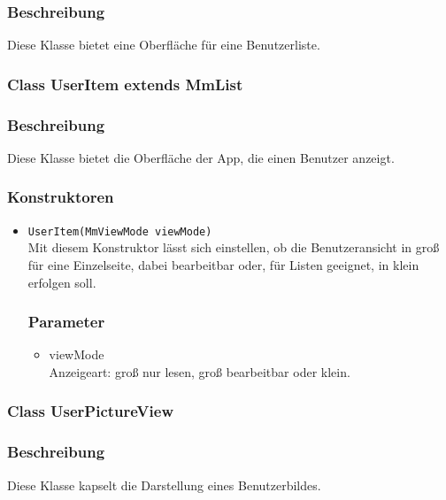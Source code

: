 \documentclass[a4paper]{scrreprt}
\begin{document}
\subsubsection*{Beschreibung}
Diese Klasse bietet eine Oberfläche für eine Benutzerliste.


\subsubsection{Class UserItem extends MmList}
\subsubsection*{Beschreibung}
Diese Klasse bietet die Oberfläche der App, die einen Benutzer anzeigt.
\subsubsection*{Konstruktoren}
\begin{addmargin}[25pt]{0pt}
\begin{itemize}

\item \texttt{UserItem(MmViewMode viewMode)}\\
	Mit diesem Konstruktor lässt sich einstellen, ob die Benutzeransicht in groß für eine Einzelseite, dabei bearbeitbar oder, für Listen geeignet, in klein erfolgen soll.


	\subsubsection*{Parameter}
	\begin{itemize}
	\item viewMode \\
		Anzeigeart: groß nur lesen, groß bearbeitbar oder klein.
	\end{itemize}

\end{itemize}
\end{addmargin}


\subsubsection{Class UserPictureView}
\subsubsection*{Beschreibung}
Diese Klasse kapselt die Darstellung eines Benutzerbildes.
\end{document}

